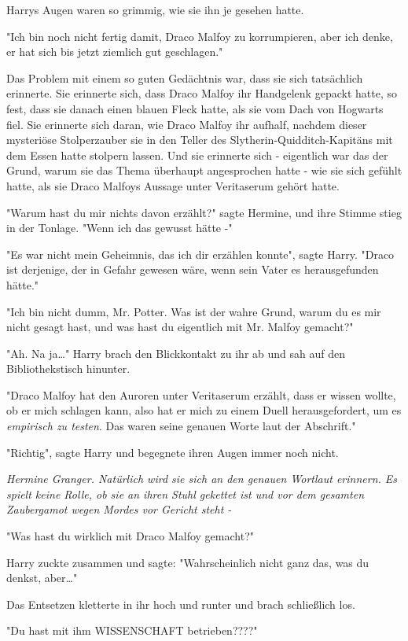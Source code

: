 {Harrys Augen waren so grimmig, wie sie ihn je gesehen hatte.

"Ich bin noch nicht fertig damit, Draco Malfoy zu korrumpieren, aber ich denke, er hat sich bis jetzt ziemlich gut geschlagen."

Das Problem mit einem so guten Gedächtnis war, dass sie sich tatsächlich erinnerte. Sie erinnerte sich, dass Draco Malfoy ihr Handgelenk gepackt hatte, so fest, dass sie danach einen blauen Fleck hatte, als sie vom Dach von Hogwarts fiel. Sie erinnerte sich daran, wie Draco Malfoy ihr aufhalf, nachdem dieser mysteriöse Stolperzauber sie in den Teller des Slytherin-Quidditch-Kapitäns mit dem Essen hatte stolpern lassen. Und sie erinnerte sich - eigentlich war das der Grund, warum sie das Thema überhaupt angesprochen hatte - wie sie sich gefühlt hatte, als sie Draco Malfoys Aussage unter Veritaserum gehört hatte.

"Warum hast du mir nichts davon erzählt?" sagte Hermine, und ihre Stimme stieg in der Tonlage. "Wenn ich das gewusst hätte -"

"Es war nicht mein Geheimnis, das ich dir erzählen konnte", sagte Harry. "Draco ist derjenige, der in Gefahr gewesen wäre, wenn sein Vater es herausgefunden hätte."

"Ich bin nicht dumm, Mr. Potter. Was ist der wahre Grund, warum du es mir nicht gesagt hast, und was hast du eigentlich mit Mr. Malfoy gemacht?"

"Ah. Na ja…" Harry brach den Blickkontakt zu ihr ab und sah auf den Bibliothekstisch hinunter.

"Draco Malfoy hat den Auroren unter Veritaserum erzählt, dass er wissen wollte, ob er mich schlagen kann, also hat er mich zu einem Duell herausgefordert, um es \emph{empirisch zu testen}. Das waren seine genauen Worte laut der Abschrift."

"Richtig", sagte Harry und begegnete ihren Augen immer noch nicht.

\emph{Hermine Granger. Natürlich wird sie sich an den genauen Wortlaut erinnern. Es spielt keine Rolle, ob sie an ihren Stuhl gekettet ist und vor dem gesamten Zaubergamot wegen Mordes vor Gericht steht -}

"Was hast du wirklich mit Draco Malfoy gemacht?"

Harry zuckte zusammen und sagte: "Wahrscheinlich nicht ganz das, was du denkst, aber…"

Das Entsetzen kletterte in ihr hoch und runter und brach schließlich los.

"Du hast mit ihm WISSENSCHAFT betrieben????"

}
